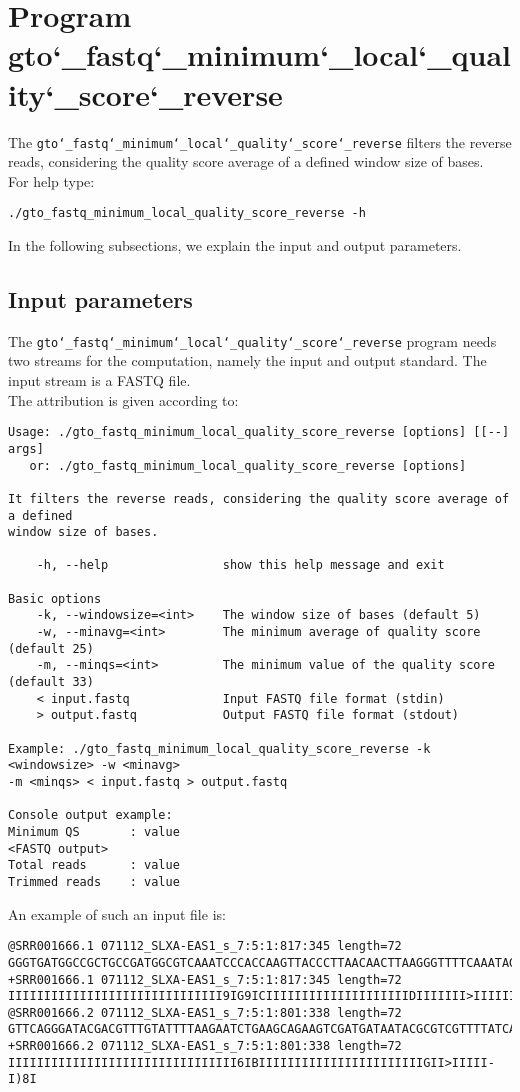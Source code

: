 \section{Program gto\char`_fastq\char`_minimum\char`_local\char`_quality\char`_score\char`_reverse}
The \texttt{gto\char`_fastq\char`_minimum\char`_local\char`_quality\char`_score\char`_reverse} filters the reverse reads, considering the quality score average of a defined window size of bases.\\
For help type:
\begin{lstlisting}
./gto_fastq_minimum_local_quality_score_reverse -h
\end{lstlisting}
In the following subsections, we explain the input and output parameters.

\subsection*{Input parameters}

The \texttt{gto\char`_fastq\char`_minimum\char`_local\char`_quality\char`_score\char`_reverse} program needs two streams for the computation, namely the input and output standard. The input stream is a FASTQ file.\\
The attribution is given according to:
\begin{lstlisting}
Usage: ./gto_fastq_minimum_local_quality_score_reverse [options] [[--] args]
   or: ./gto_fastq_minimum_local_quality_score_reverse [options]

It filters the reverse reads, considering the quality score average of a defined 
window size of bases.

    -h, --help                show this help message and exit

Basic options
    -k, --windowsize=<int>    The window size of bases (default 5)
    -w, --minavg=<int>        The minimum average of quality score (default 25)
    -m, --minqs=<int>         The minimum value of the quality score (default 33)
    < input.fastq             Input FASTQ file format (stdin)
    > output.fastq            Output FASTQ file format (stdout)

Example: ./gto_fastq_minimum_local_quality_score_reverse -k <windowsize> -w <minavg> 
-m <minqs> < input.fastq > output.fastq

Console output example:
Minimum QS       : value
<FASTQ output>
Total reads      : value
Trimmed reads    : value
\end{lstlisting}
An example of such an input file is:
\begin{lstlisting}
@SRR001666.1 071112_SLXA-EAS1_s_7:5:1:817:345 length=72
GGGTGATGGCCGCTGCCGATGGCGTCAAATCCCACCAAGTTACCCTTAACAACTTAAGGGTTTTCAAATAGA
+SRR001666.1 071112_SLXA-EAS1_s_7:5:1:817:345 length=72
IIIIIIIIIIIIIIIIIIIIIIIIIIIIII9IG9ICIIIIIIIIIIIIIIIIIIIIDIIIIIII>IIIIII/
@SRR001666.2 071112_SLXA-EAS1_s_7:5:1:801:338 length=72
GTTCAGGGATACGACGTTTGTATTTTAAGAATCTGAAGCAGAAGTCGATGATAATACGCGTCGTTTTATCAT
+SRR001666.2 071112_SLXA-EAS1_s_7:5:1:801:338 length=72
IIIIIIIIIIIIIIIIIIIIIIIIIIIIIIII6IBIIIIIIIIIIIIIIIIIIIIIIIGII>IIIII-I)8I
\end{lstlisting}

